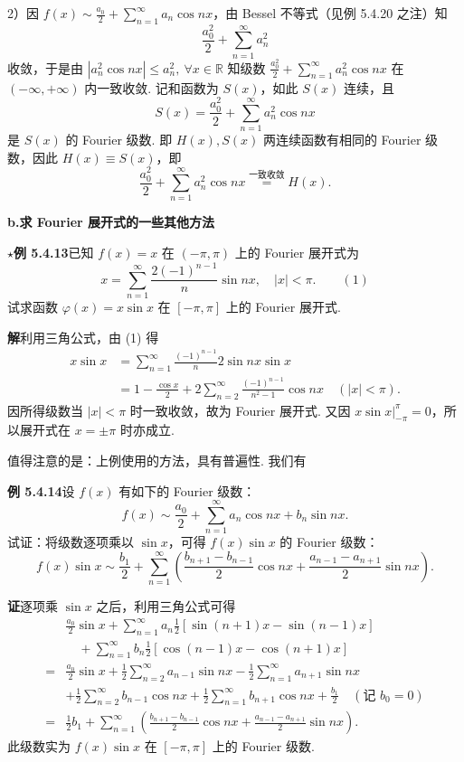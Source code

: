 \documentclass[UTF8, 12pt, fontset=fandol, oneside]{ctexart}
\providecommand{\xlongequal}[1]{\stackrel{#1}{=}}
\begin{document}
2）因 $\displaystyle f(x)\sim\frac{a_0}{2}+\sum_{n=1}^{\infty}a_n\cos nx$，由 Bessel 不等式（见例 5.4.20 之注）知
\[
  \frac{a_0^2}{2}+\sum_{n=1}^{\infty}a_n^2
\]
收敛，于是由 $|a_n^2\cos nx|\le a_n^2,\ \forall x\in\mathbb R$ 知级数
$\displaystyle\frac{a_0^2}{2}+\sum_{n=1}^{\infty}a_n^2\cos nx$ 在 $(-\infty,+\infty)$ 内一致收敛.
记和函数为 $S(x)$，如此 $S(x)$ 连续，且
\[
  S(x)=\frac{a_0^2}{2}+\sum_{n=1}^{\infty}a_n^2\cos nx
\]
是 $S(x)$ 的 Fourier 级数. 即 $H(x),S(x)$ 两连续函数有相同的 Fourier 级数，因此
$H(x)\equiv S(x)$，即
\[
  \frac{a_0^2}{2}+\sum_{n=1}^{\infty}a_n^2\cos nx
  \xlongequal{\text{一致收敛}}H(x).
\]

\noindent\textbf{b.\quad 求 Fourier 展开式的一些其他方法}

\noindent\(\star\)\textbf{例 5.4.13}\quad 已知 $f(x)=x$ 在 $(-\pi,\pi)$ 上的 Fourier 展开式为
\[
  x=\sum_{n=1}^{\infty}\frac{2(-1)^{n-1}}{n}\sin nx,\quad |x|<\pi. \qquad(1)
\]
试求函数 $\varphi(x)=x\sin x$ 在 $[-\pi,\pi]$ 上的 Fourier 展开式.

\noindent\textbf{解}\quad 利用三角公式，由 (1) 得
\[
\begin{aligned}
x\sin x
&=\sum_{n=1}^{\infty}\frac{(-1)^{n-1}}{n}2\sin nx\sin x\\
&=1-\frac{\cos x}{2}+2\sum_{n=2}^{\infty}\frac{(-1)^{n-1}}{n^2-1}\cos nx\quad(|x|<\pi).
\end{aligned}
\]
因所得级数当 $|x|<\pi$ 时一致收敛，故为 Fourier 展开式. 又因
$x\sin x\big|_{-\pi}^{\pi}=0$，所以展开式在 $x=\pm\pi$ 时亦成立.

值得注意的是：上例使用的方法，具有普遍性. 我们有

\noindent\textbf{例 5.4.14}\quad 设 $f(x)$ 有如下的 Fourier 级数：
\[
  f(x)\sim\frac{a_0}{2}+\sum_{n=1}^{\infty}a_n\cos nx+b_n\sin nx.
\]
试证：将级数逐项乘以 $\sin x$，可得 $f(x)\sin x$ 的 Fourier 级数：
\[
  f(x)\sin x\sim\frac{b_1}{2}
  +\sum_{n=1}^{\infty}\left(\frac{b_{n+1}-b_{n-1}}2\cos nx
  +\frac{a_{n-1}-a_{n+1}}2\sin nx\right).
\]

\noindent\textbf{证}\quad 逐项乘 $\sin x$ 之后，利用三角公式可得
\[
\begin{aligned}
&\frac{a_0}{2}\sin x+\sum_{n=1}^{\infty}a_n\frac12[\sin(n+1)x-\sin(n-1)x]\\
&\quad+\sum_{n=1}^{\infty}b_n\frac12[\cos(n-1)x-\cos(n+1)x]\\
={}&\frac{a_0}{2}\sin x+\frac12\sum_{n=2}^{\infty}a_{n-1}\sin nx
-\frac12\sum_{n=1}^{\infty}a_{n+1}\sin nx\\
&+\frac12\sum_{n=2}^{\infty}b_{n-1}\cos nx
+\frac12\sum_{n=1}^{\infty}b_{n+1}\cos nx+\frac{b_1}{2}\quad(\text{记 }b_0=0)\\
={}&\frac12b_1+\sum_{n=1}^{\infty}\left(\frac{b_{n+1}-b_{n-1}}2\cos nx
+\frac{a_{n-1}-a_{n+1}}2\sin nx\right).
\end{aligned}
\]
此级数实为 $f(x)\sin x$ 在 $[-\pi,\pi]$ 上的 Fourier 级数.
\end{document}
